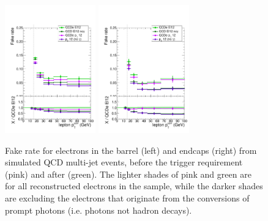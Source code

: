 \begin{figure}[htb]
	\centering 
\includegraphics[width=0.35\textwidth]{plots_fakerate/measurement/el_hltid_barrel}
\includegraphics[width=0.35\textwidth]{plots_fakerate/measurement/el_hltid_endcap}
	\caption{Fake rate for electrons in the barrel (left) and endcaps (right) from simulated QCD multi-jet events, before the trigger requirement (pink) and after (green). The lighter shades of pink and green are  for all reconstructed electrons in the sample, while the darker shades are excluding the electrons that originate from the conversions of prompt photons (i.e. photons not hadron decays).} 
	\label{fig:frmeas-hltid}
\end{figure}


